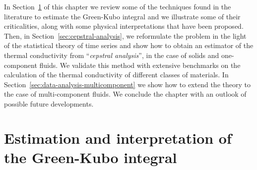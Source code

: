\begin{LEtext}
In Section~\ref{sec:data-analysis-methods} of this chapter we review some of the techniques found in the literature to estimate the Green-Kubo integral and we illustrate some of their criticalities, along with some physical interpretations that have been proposed. 
Then, in Section~\ref{sec:cepstral-analysis}, we reformulate the problem in the light of the statistical theory of time series and show how to obtain an estimator of the thermal conductivity from ``\emph{cepstral analysis}'', in the case of solids and one-component fluids. We validate this method with extensive benchmarks on the calculation of the thermal conductivity of different classes of materials. 
In Section~\ref{sec:data-analysis-multicomponent} we show how to extend the theory to the case of multi-component fluids. 
We conclude the chapter with an outlook of possible future developments. 

\end{LEtext}


\section{Estimation and interpretation of the Green-Kubo integral} \label{sec:data-analysis-methods}

